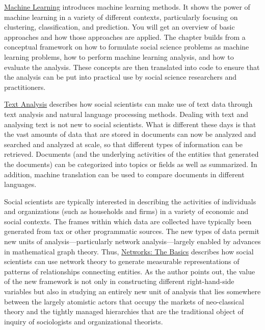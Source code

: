 \documentclass[]{krantz}
\begin{document}
\protect\hyperlink{chap:ml}{Machine Learning} introduces machine
learning methods. It shows the power of machine learning in a variety of
different contexts, particularly focusing on clustering, classification,
and prediction. You will get an overview of basic approaches and how
those approaches are applied. The chapter builds from a conceptual
framework on how to formulate social science problems as machine
learning problems, how to perform machine learning analysis, and how to
evaluate the analysis. These concepts are then translated into code to
ensure that the analysis can be put into practical use by social science
researchers and practitioners.

\protect\hyperlink{chap:text}{Text Analysis} describes how social
scientists can make use of text data through text analysis and natural
language processing methods. Dealing with text and analysing text is not
new to social scientists. What is different these days is that the vast
amounts of data that are stored in documents can now be analyzed and
searched and analyzed at scale, so that different types of information
can be retrieved. Documents (and the underlying activities of the
entities that generated the documents) can be categorized into topics or
fields as well as summarized. In addition, machine translation can be
used to compare documents in different languages.

Social scientists are typically interested in describing the activities
of individuals and organizations (such as households and firms) in a
variety of economic and social contexts. The frames within which data
are collected have typically been generated from tax or other
programmatic sources. The new types of data permit new units of
analysis---particularly network analysis---largely enabled by advances
in mathematical graph theory. Thus,
\protect\hyperlink{chap:networks}{Networks: The Basics} describes how
social scientists can use network theory to generate measurable
representations of patterns of relationships connecting entities. As the
author points out, the value of the new framework is not only in
constructing different right-hand-side variables but also in studying an
entirely new unit of analysis that lies somewhere between the largely
atomistic actors that occupy the markets of neo-classical theory and the
tightly managed hierarchies that are the traditional object of inquiry
of sociologists and organizational theorists.
\end{document}
